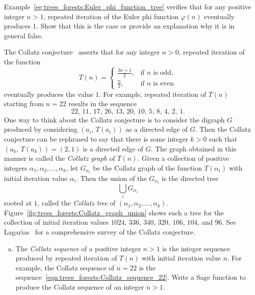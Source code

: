 \begin{problem}
\item Example~\ref{eg:trees_forests:Euler_phi_function_tree} verifies
  that for any positive integer $n > 1$, repeated iteration of the
  Euler phi function $\varphi(n)$ eventually produces $1$. Show that
  this is the case or provide an explanation why it is in general
  false.

\item The Collatz conjecture~\cite{Lagarias1985} asserts that for any
  integer $n > 0$, repeated iteration of the function
  \[
  T(n)
  =
  \begin{cases}
  \frac{3n + 1}{2}, & \text{if $n$ is odd}, \\
  \frac{n}{2}, & \text{if $n$ is even}
  \end{cases}
  \]
  eventually produces the value $1$. For example, repeated iteration
  of $T(n)$ starting from $n = 22$ results in the sequence
  \begin{equation}
  \label{eqn:trees_forests:Collatz_sequence_22}
  22,\, 11,\, 17,\, 26,\, 13,\, 20,\, 10,\, 5,\, 8,\, 4,\, 2,\, 1.
  \end{equation}
  One way to think about the Collatz conjecture is to consider the
  digraph $G$ produced by considering $(a_i,\, T(a_i))$ as a directed
  edge of $G$. Then the Collatz conjecture can be rephrased to say
  that there is some integer $k > 0$ such that
  $(a_k,\, T(a_k)) = (2, 1)$ is a directed edge of $G$. The graph
  obtained in this manner is called the \emph{Collatz graph} of
  $T(n)$. Given a collection of positive integers
  $\alpha_1, \alpha_2, \dots, \alpha_k$, let $G_{\alpha_i}$ be the
  Collatz graph of the function $T(\alpha_i)$ with initial iteration
  value $\alpha_i$. Then the union of the $G_{\alpha_i}$ is the
  directed tree
  \[
  \bigcup_i G_{\alpha_i}
  \]
  rooted at $1$, called the \emph{Collatz tree} of
  $(\alpha_1, \alpha_2, \dots, \alpha_k)$.
  Figure~\ref{fig:trees_forests:Collatz_graph_union} shows such a tree
  for the collection of initial iteration values $1024$, $336$, $340$,
  $320$, $106$, $104$, and $96$. See
  Lagarias~\cite{Lagarias2009a,Lagarias2009b} for a comprehensive
  survey of the Collatz conjecture.
  \begin{enumerate}[(a)]
  \item The \emph{Collatz sequence} of a positive integer $n > 1$ is
    the integer sequence produced by repeated iteration of $T(n)$ with
    initial iteration value $n$. For example, the Collatz sequence
    of $n = 22$ is the
    sequence~\eqref{eqn:trees_forests:Collatz_sequence_22}. Write a
    Sage function to produce the Collatz sequence of an integer $n > 1$.


\end{enumerate}
\end{problem}
